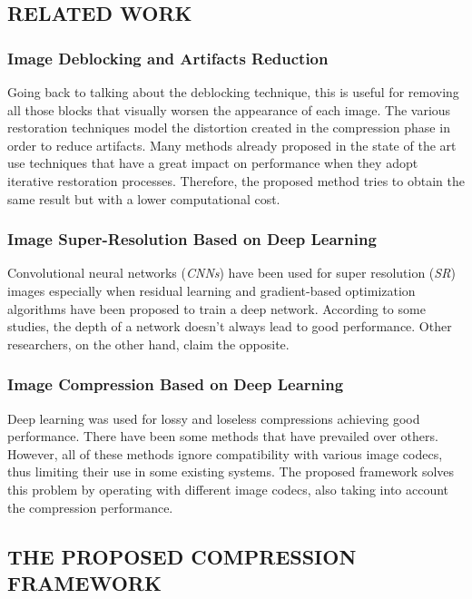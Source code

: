 \subsection{RELATED WORK}
\subsubsection{Image Deblocking and Artifacts Reduction}
Going back to talking about the deblocking technique, this is useful for removing 
all those blocks that visually worsen the appearance of each image. 
The various restoration techniques model the distortion created in the compression 
phase in order to reduce artifacts. Many methods already proposed 
in the state of the art use techniques that have a great impact on performance 
when they adopt iterative restoration processes. Therefore, the proposed 
method tries to obtain the same result but with a lower computational 
cost.

\subsubsection{Image Super-Resolution Based on Deep Learning}
Convolutional neural networks (\emph{CNNs}) have been used for super resolution 
(\emph{SR}) images especially when residual learning and gradient-based optimization 
algorithms have been proposed to train a deep network. According to 
some studies, the depth of a network doesn't always lead to good performance. 
Other researchers, on the other hand, claim the opposite.

\subsubsection{Image Compression Based on Deep Learning}
Deep learning was used for lossy and loseless compressions achieving good 
performance. There have been some methods that have prevailed over others. 
However, all of these methods ignore compatibility with various image codecs, 
thus limiting their use in some existing systems. The proposed framework 
solves this problem by operating with different image codecs, also taking into 
account the compression performance.

\subsection{THE PROPOSED COMPRESSION FRAMEWORK}
